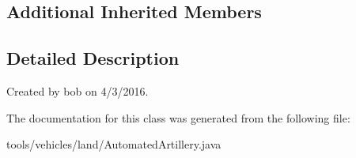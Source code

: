 \subsection*{Additional Inherited Members}


\subsection{Detailed Description}
Created by bob on 4/3/2016. 

The documentation for this class was generated from the following file\+:\begin{DoxyCompactItemize}
\item 
tools/vehicles/land/Automated\+Artillery.\+java\end{DoxyCompactItemize}
